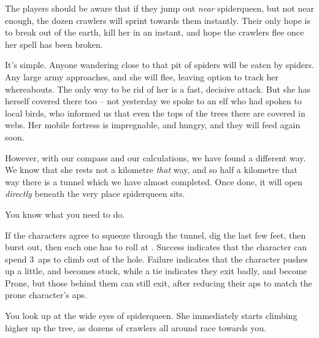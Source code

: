 The players should be aware that if they jump out \emph{near} \gls{spiderqueen}, but not near enough, the dozen \glspl{crawler} will sprint towards them instantly.
Their only hope is to break out of the earth, kill her in an instant, and hope the \glspl{crawler} flee once her spell has been broken.


\begin{speechtext}
  It's simple.
  Anyone wandering close to that pit of spiders will be eaten by spiders.
  Any large army approaches, and she will flee, leaving option to track her whereabouts.
  The only way to be rid of her is a fast, decisive attack.
  But she has herself covered there too -- not yesterday we spoke to an elf who had spoken to local birds, who informed us that even the tops of the trees there are covered in webs.
  Her mobile fortress is impregnable, and hungry, and they will feed again soon.

  However, with our compass and our calculations, we have found a different way.
  We know that she rests not a kilometre \emph{that} way, and so half a kilometre that way there is a tunnel which we have almost completed.
  Once done, it will open \emph{directly} beneath the very place \gls{spiderqueen} sits.

  You know what you need to do.
\end{speechtext}

\keras

\showStdSpells



If the characters agree to squeeze through the tunnel, dig the last few feet, then burst out, then each one has to roll  at \tn[7].
Success indicates that the character can spend 3~\glspl{ap} to climb out of the hole.
Failure indicates that the character pushes up a little, and becomes stuck,%
while a tie indicates they exit badly, and become Prone, but those behind them can still exit, after reducing their \glspl{ap} to match the prone character's \glspl{ap}.

\begin{boxtext}
  You look up at the wide eyes of \gls{spiderqueen}.
  She immediately starts climbing higher up the tree, as dozens of \glspl{crawler} all around race towards you.
\end{boxtext}

